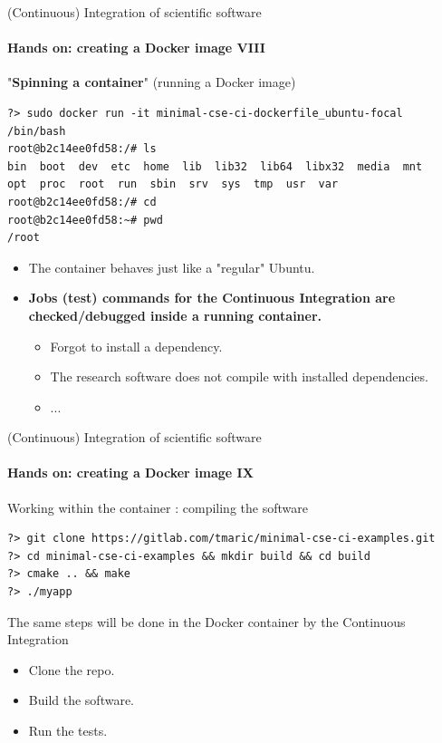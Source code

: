 \begin{frame}[fragile]{(Continuous) Integration of scientific software} 
    \framesubtitle{Hands on: creating a Docker image VIII} 
    \vfill

    "\textbf{Spinning a container}" (running a Docker image) 

    \begin{verbatim}
?> sudo docker run -it minimal-cse-ci-dockerfile_ubuntu-focal /bin/bash
root@b2c14ee0fd58:/# ls
bin  boot  dev  etc  home  lib  lib32  lib64  libx32  media  mnt  
opt  proc  root  run  sbin  srv  sys  tmp  usr  var
root@b2c14ee0fd58:/# cd 
root@b2c14ee0fd58:~# pwd
/root
    \end{verbatim}

    \begin{itemize}
        \item The container behaves just like a "regular" Ubuntu. 
        \item \textbf{Jobs (test) commands for the Continuous Integration are checked/debugged inside a running container.}
            \begin{itemize}
                \item Forgot to install a dependency.
                \item The research software does not compile with installed dependencies.
                \item ...
            \end{itemize}
    \end{itemize}

\end{frame}


\begin{frame}[fragile]{(Continuous) Integration of scientific software} 
    \framesubtitle{Hands on: creating a Docker image IX} 
    \vfill

    Working within the container : compiling the software

    \begin{verbatim}
?> git clone https://gitlab.com/tmaric/minimal-cse-ci-examples.git
?> cd minimal-cse-ci-examples && mkdir build && cd build
?> cmake .. && make
?> ./myapp
    \end{verbatim}

    The same steps will be done in the Docker container by the Continuous Integration  
    \begin{itemize}
        \item Clone the repo. 
        \item Build the software.  
        \item Run the tests. 
    \end{itemize}

\end{frame}


